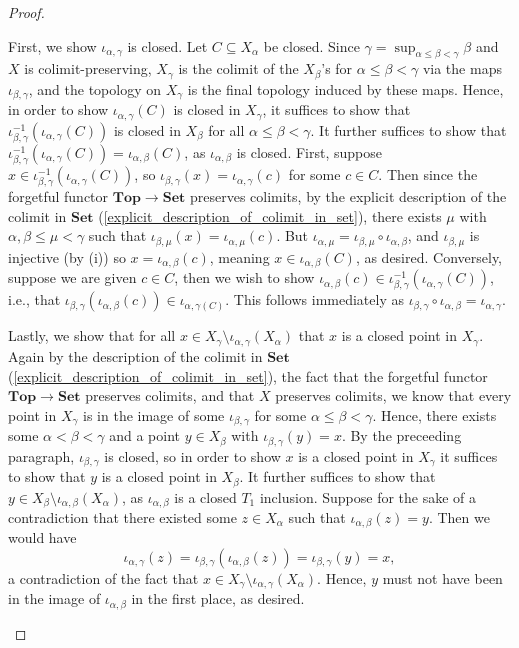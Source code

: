 \documentclass{amsart}
\theoremstyle{plain}
\theoremstyle{definition}
\newcommand{\Top}{\mbf{Top}}
\newcommand{\Set}{\mbf{Set}}
\newcommand{\sseq}{\subseteq}
\newcommand{\0}{\mathbf{0}}
\newcommand{\mbf}[1]{\mathbf{#1}}
\renewcommand{\(}{\left(}
\renewcommand{\)}{\right)}
\begin{document}
\begin{proof}
\begin{enumerate}[label=(\roman*),listparindent=\parindent,parsep=0pt]
    First, we show $\iota_{\alpha,\gamma}$ is closed. Let $C\sseq X_\alpha$ be closed. Since $\gamma=\sup_{\alpha\leq\beta<\gamma}\beta$ and $X$ is colimit-preserving, $X_\gamma$ is the colimit of the $X_\beta$'s for $\alpha\leq\beta<\gamma$ via the maps $\iota_{\beta,\gamma}$, and the topology on $X_\gamma$ is the final topology induced by these maps. Hence, in order to show $\iota_{\alpha,\gamma}(C)$ is closed in $X_\gamma$, it suffices to show that $\iota_{\beta,\gamma}^{-1}(\iota_{\alpha,\gamma}(C))$ is closed in $X_\beta$ for all $\alpha\leq\beta<\gamma$. It further suffices to show that $\iota_{\beta,\gamma}^{-1}(\iota_{\alpha,\gamma}(C))=\iota_{\alpha,\beta}(C)$, as $\iota_{\alpha,\beta}$ is closed. First, suppose $x\in\iota_{\beta,\gamma}^{-1}(\iota_{\alpha,\gamma}(C))$, so $\iota_{\beta,\gamma}(x)=\iota_{\alpha,\gamma}(c)$ for some $c\in C$. Then since the forgetful functor $\Top\to\Set$ preserves colimits, by the explicit description of the colimit in $\Set$ (\autoref{explicit_description_of_colimit_in_set}), there exists $\mu$ with $\alpha,\beta\leq\mu<\gamma$ such that $\iota_{\beta,\mu}(x)=\iota_{\alpha,\mu}(c)$. But $\iota_{\alpha,\mu}=\iota_{\beta,\mu}\circ\iota_{\alpha,\beta}$, and $\iota_{\beta,\mu}$ is injective (by (i)) so $x=\iota_{\alpha,\beta}(c)$, meaning $x\in\iota_{\alpha,\beta}(C)$, as desired. Conversely, suppose we are given $c\in C$, then we wish to show $\iota_{\alpha,\beta}(c)\in\iota_{\beta,\gamma}^{-1}(\iota_{\alpha,\gamma}(C))$, i.e., that $\iota_{\beta,\gamma}(\iota_{\alpha,\beta}(c))\in\iota_{\alpha,\gamma(C)}$. This follows immediately as $\iota_{\beta,\gamma}\circ\iota_{\alpha,\beta}=\iota_{\alpha,\gamma}$.

    Lastly, we show that for all $x\in X_\gamma\setminus\iota_{\alpha,\gamma}(X_\alpha)$ that $x$ is a closed point in $X_\gamma$. Again by the description of the colimit in $\Set$ (\autoref{explicit_description_of_colimit_in_set}), the fact that the forgetful functor $\Top\to\Set$ preserves colimits, and that $X$ preserves colimits, we know that every point in $X_\gamma$ is in the image of some $\iota_{\beta,\gamma}$ for some $\alpha\leq\beta<\gamma$. Hence, there exists some $\alpha<\beta<\gamma$ and a point $y\in X_\beta$ with $\iota_{\beta,\gamma}(y)=x$. By the preceeding paragraph, $\iota_{\beta,\gamma}$ is closed, so in order to show $x$ is a closed point in $X_\gamma$ it suffices to show that $y$ is a closed point in $X_\beta$. It further suffices to show that $y\in X_\beta\setminus\iota_{\alpha,\beta}(X_\alpha)$, as $\iota_{\alpha,\beta}$ is a closed $T_1$ inclusion. Suppose for the sake of a contradiction that there existed some $z\in X_\alpha$ such that $\iota_{\alpha,\beta}(z)=y$. Then we would have
    \[\iota_{\alpha,\gamma}(z)=\iota_{\beta,\gamma}(\iota_{\alpha,\beta}(z))=\iota_{\beta,\gamma}(y)=x,\] 
    a contradiction of the fact that $x\in X_\gamma\setminus\iota_{\alpha,\gamma}(X_\alpha)$. Hence, $y$ must not have been in the image of $\iota_{\alpha,\beta}$ in the first place, as desired.
    \qedhere
  \end{enumerate}
\end{proof}
\end{document}
